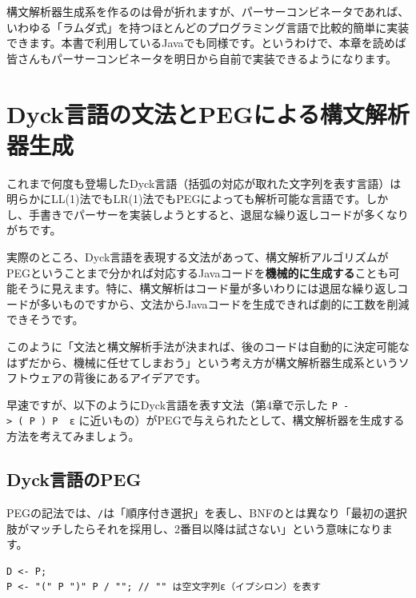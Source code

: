 構文解析器生成系を作るのは骨が折れますが、パーサーコンビネータであれば、いわゆる「ラムダ式」を持つほとんどのプログラミング言語で比較的簡単に実装できます。本書で利用しているJavaでも同様です。というわけで、本章を読めば皆さんもパーサーコンビネータを明日から自前で実装できるようになります。

\hypertarget{chapter6-dyckux8a00ux8a9eux306eux6587ux6cd5ux3068pegux306bux3088ux308bux69cbux6587ux89e3ux6790ux5668ux751fux6210}{%
\section{Dyck言語の文法とPEGによる構文解析器生成}\label{chapter6-dyckux8a00ux8a9eux306eux6587ux6cd5ux3068pegux306bux3088ux308bux69cbux6587ux89e3ux6790ux5668ux751fux6210}}

これまで何度も登場したDyck言語（括弧の対応が取れた文字列を表す言語）は明らかにLL(1)法でもLR(1)法でもPEGによっても解析可能な言語です。しかし、手書きでパーサーを実装しようとすると、退屈な繰り返しコードが多くなりがちです。

実際のところ、Dyck言語を表現する文法があって、構文解析アルゴリズムがPEGということまで分かれば対応するJavaコードを\textbf{機械的に生成する}ことも可能そうに見えます。特に、構文解析はコード量が多いわりには退屈な繰り返しコードが多いものですから、文法からJavaコードを生成できれば劇的に工数を削減できそうです。

このように「文法と構文解析手法が決まれば、後のコードは自動的に決定可能なはずだから、機械に任せてしまおう」という考え方が構文解析器生成系というソフトウェアの背後にあるアイデアです。

早速ですが、以下のようにDyck言語を表す文法（第4章で示した
\texttt{P\ -\textgreater{}\ (\ P\ )\ P\ \textbar{}\ ε}
に近いもの）がPEGで与えられたとして、構文解析器を生成する方法を考えてみましょう。

\hypertarget{chapter6-dyckux8a00ux8a9eux306epeg}{%
\subsection{Dyck言語のPEG}\label{chapter6-dyckux8a00ux8a9eux306epeg}}

PEGの記法では、\texttt{/}は「順序付き選択」を表し、BNFの\texttt{\textbar{}}とは異なり「最初の選択肢がマッチしたらそれを採用し、2番目以降は試さない」という意味になります。

\begin{verbatim}
D <- P;
P <- "(" P ")" P / ""; // "" は空文字列ε（イプシロン）を表す
\end{verbatim}

